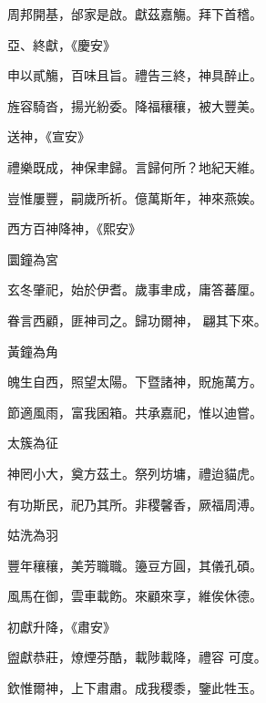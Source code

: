 \begin{pinyinscope}
 周邦開基，邰家是啟。獻茲嘉觴。拜下首稽。



 亞、終獻，《慶安》



 申以貳觴，百味且旨。禮告三終，神具醉止。



 旌容騎沓，揚光紛委。降福穰穰，被大豐美。



 送神，《宣安》



 禮樂既成，神保聿歸。言歸何所？地紀天維。



 豈惟屢豐，嗣歲所祈。億萬斯年，神來燕娭。



 西方百神降神，《熙安》



 圜鐘為宮



 玄冬肇祀，始於伊耆。歲事聿成，庸答蕃厘。



 眷言西顧，匪神司之。歸功爾神，
 翩其下來。



 黃鐘為角



 魄生自西，照望太陽。下暨諸神，貺施萬方。



 節適風雨，富我囷箱。共承嘉祀，惟以迪嘗。



 太簇為征



 神罔小大，奠方茲土。祭列坊墉，禮迨貓虎。



 有功斯民，祀乃其所。非稷馨香，厥福周溥。



 姑洗為羽



 豐年穰穰，美芳職職。籩豆方圓，其儀孔碩。



 風馬在御，雲車載飭。來顧來享，維俟休德。



 初獻升降，《肅安》



 盥獻恭莊，燎煙芬酷，載陟載降，禮容
 可度。



 欽惟爾神，上下肅肅。成我稷黍，鑒此牲玉。




\end{pinyinscope}
